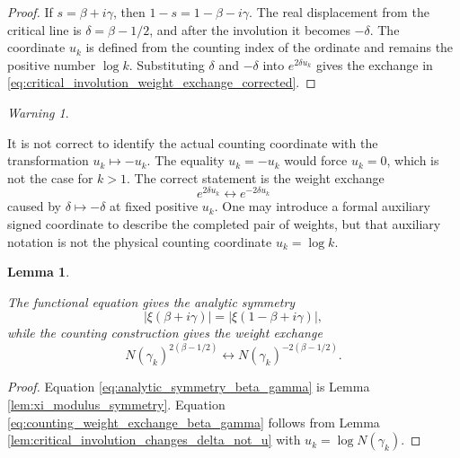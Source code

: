 \documentclass[11pt]{amsart}
\numberwithin{equation}{section}
\theoremstyle{plain}
\newtheorem{lemma}[theorem]{Lemma}
\theoremstyle{definition}
\theoremstyle{remark}
\newtheorem{warning}[theorem]{Warning}
\begin{document}
\begin{proof}
If \(s=\beta+i\gamma\), then \(1-s=1-\beta-i\gamma\).  The real displacement from the critical line is \(\delta=\beta-1/2\), and after the involution it becomes \(-\delta\).  The coordinate \(u_k\) is defined from the counting index of the ordinate and remains the positive number \(\log k\).  Substituting \(\delta\) and \(-\delta\) into \(e^{2\delta u_k}\) gives the exchange in \eqref{eq:critical_involution_weight_exchange_corrected}.
\end{proof}

\begin{warning}
\label{warn:not_u_equals_minus_u}

It is not correct to identify the actual counting coordinate with the transformation \(u_k\mapsto -u_k\).  The equality \(u_k=-u_k\) would force \(u_k=0\), which is not the case for \(k>1\).  The correct statement is the weight exchange
\begin{equation}
e^{2\delta u_k}
\leftrightarrow
e^{-2\delta u_k}
\label{eq:not_u_equals_minus_u_weight_exchange}
\end{equation}
caused by \(\delta\mapsto-\delta\) at fixed positive \(u_k\).  One may introduce a formal auxiliary signed coordinate to describe the completed pair of weights, but that auxiliary notation is not the physical counting coordinate \(u_k=\log k\).

\end{warning}

\begin{lemma}
\label{lem:analytic_symmetry_counting_weight_exchange}

The functional equation gives the analytic symmetry
\begin{equation}
|\xi(\beta+i\gamma)|
=
|\xi(1-\beta+i\gamma)|,
\label{eq:analytic_symmetry_beta_gamma}
\end{equation}
while the counting construction gives the weight exchange
\begin{equation}
N(\gamma_k)^{2(\beta-1/2)}
\longleftrightarrow
N(\gamma_k)^{-2(\beta-1/2)}.
\label{eq:counting_weight_exchange_beta_gamma}
\end{equation}

\end{lemma}

\begin{proof}
Equation \eqref{eq:analytic_symmetry_beta_gamma} is Lemma \ref{lem:xi_modulus_symmetry}.  Equation \eqref{eq:counting_weight_exchange_beta_gamma} follows from Lemma \ref{lem:critical_involution_changes_delta_not_u} with \(u_k=\log N(\gamma_k)\).
\end{proof}
\end{document}
